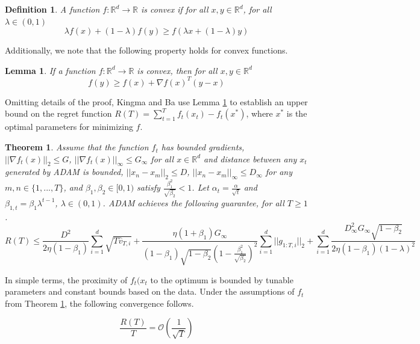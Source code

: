 \documentclass[letterpaper,11 pt]{article}
\newtheorem{theorem}{Theorem}
\newtheorem{corollary}{Corollary}
\newtheorem{lemma}{Lemma}
\newtheorem{definition}{Definition}
\begin{document}
\begin{definition}\label{def:convex}
A function $f:\mathbb{R}^{d}\rightarrow \mathbb{R}$ is convex if for all $x,y\in \mathbb{R}^{d}$, for all $\lambda \in (0,1)$
\[
\lambda f(x) + (1-\lambda)f(y) \geq f(\lambda x + (1-\lambda)y)
\]
\end{definition}
Additionally, we note that the following property holds for convex functions.
\begin{lemma}\label{lemma:convex}
If a function $f:\mathbb{R}^{d}\rightarrow \mathbb{R}$ is convex, then for all $x,y\in \mathbb{R}^{d}$
\[
f(y) \geq f(x) + \nabla f(x)^{T} (y-x)
\]
\end{lemma}

Omitting details of the proof, Kingma and Ba use Lemma \ref{lemma:convex} to establish an upper bound on the regret function $R(T) = \sum_{t=1}^{T}{f_{t}(x_{t}) - f_{t}(x^{*}) }$, where $x^{*}$ is the optimal parameters for minimizing $f$. 

\begin{theorem}\label{thm:adamregbound}
Assume that the function $f_t$ has bounded gradients, $|| \nabla f_{t}(x)||_{2} \leq G$, $|| \nabla f_{t}(x)||_{\infty} \leq G_{\infty}$ for all $x \in \mathbb{R}^{d}$ and distance between any $x_t$ generated by ADAM is bounded, $||x_{n} - x_{m}||_{2} \leq D$, $||x_{n} - x_{m}||_{\infty} \leq D_{\infty}$ for any $m,n \in \{1,...,T\}$, and $\beta_{1}, \beta_{2} \in [0,1)$ satisfy $\frac{\beta_{1}^{2}}{\sqrt{\beta_{2}}} < 1$. Let $\alpha_{t} = \frac{\alpha}{\sqrt{t}}$ and $\beta_{1,t} = \beta_{1}\lambda^{t-1}$, $\lambda \in (0,1)$. ADAM achieves the following guarantee, for all $T \geq 1$.
\[
R(T)\leq\frac{D^{2}}{2\eta(1-\beta_{1})}\sum_{i=1}^{d}\sqrt{T\hat{v}_{T,i}}+\frac{\eta(1+\beta_{1})G_{\infty}}{(1-\beta_{1})\sqrt{1-\beta_{2}}(1-\frac{\beta_{1}^{2}}{\sqrt{\beta_{2}}})^{2}}\sum_{i=1}^{d}||g_{1:T,i}||_{2}+\sum_{i=1}^{d}\frac{D_{\infty}^{2}G_{\infty}\sqrt{1-\beta_{2}}}{2\eta(1-\beta_{1})(1-\lambda)^{2}}
\]
\end{theorem}

In simple terms, the proximity of $f_{t}(x_{t}$ to the optimum is bounded by tunable parameters and constant bounds based on the data. Under the assumptions of $f_{t}$ from Theorem \ref{thm:adamregbound}, the following convergence follows.

\[
\frac{R(T)}{T} = \mathcal{O}\left(\frac{1}{\sqrt{T}}\right)
\]
\end{document}
